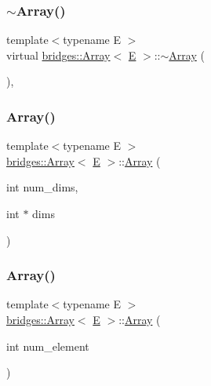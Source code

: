 \subsubsection{\texorpdfstring{$\sim$Array()}{~Array()}}
{\footnotesize\ttfamily template$<$typename E $>$ \\
virtual \mbox{\hyperlink{classbridges_1_1_array}{bridges\+::\+Array}}$<$ \mbox{\hyperlink{namespacebridges_acfb0a4f7877d8f63de3e6862004c50eda3a3ea00cfc35332cedf6e5e9a32e94da}{E}} $>$\+::$\sim$\mbox{\hyperlink{classbridges_1_1_array}{Array}} (\begin{DoxyParamCaption}{ }\end{DoxyParamCaption})\hspace{0.3cm}{\ttfamily [inline]}, {\ttfamily [virtual]}}

\mbox{\label{classbridges_1_1_array_a25ff771f9ba7f365465f309ed2dd3688}} 
\subsubsection{\texorpdfstring{Array()}{Array()}\hspace{0.1cm}{\footnotesize\ttfamily [2/6]}}
{\footnotesize\ttfamily template$<$typename E $>$ \\
\mbox{\hyperlink{classbridges_1_1_array}{bridges\+::\+Array}}$<$ \mbox{\hyperlink{namespacebridges_acfb0a4f7877d8f63de3e6862004c50eda3a3ea00cfc35332cedf6e5e9a32e94da}{E}} $>$\+::\mbox{\hyperlink{classbridges_1_1_array}{Array}} (\begin{DoxyParamCaption}\item[{int}]{num\+\_\+dims,  }\item[{int $\ast$}]{dims }\end{DoxyParamCaption})\hspace{0.3cm}{\ttfamily [inline]}}

\mbox{\label{classbridges_1_1_array_a859819bc374aa90fcd84b1314034fbbf}} 
\subsubsection{\texorpdfstring{Array()}{Array()}\hspace{0.1cm}{\footnotesize\ttfamily [3/6]}}
{\footnotesize\ttfamily template$<$typename E $>$ \\
\mbox{\hyperlink{classbridges_1_1_array}{bridges\+::\+Array}}$<$ \mbox{\hyperlink{namespacebridges_acfb0a4f7877d8f63de3e6862004c50eda3a3ea00cfc35332cedf6e5e9a32e94da}{E}} $>$\+::\mbox{\hyperlink{classbridges_1_1_array}{Array}} (\begin{DoxyParamCaption}\item[{int}]{num\+\_\+element }\end{DoxyParamCaption})\hspace{0.3cm}{\ttfamily [inline]}}

